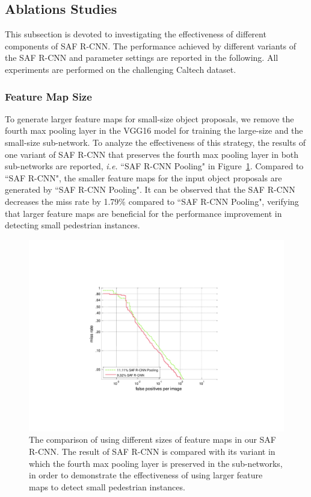 \documentclass[journal]{IEEEtran}
\begin{document}
\subsection{Ablations Studies}
This subsection is devoted to investigating the effectiveness of different components of SAF R-CNN. The performance achieved by different variants of the SAF R-CNN and parameter settings are reported in the following. All experiments are performed on the challenging Caltech dataset.

\subsubsection{Feature Map Size}
To generate larger feature maps for small-size object proposals, we remove the fourth max pooling layer in the VGG16 model for training the large-size and the small-size sub-network. To analyze the effectiveness of this strategy, the results of one variant of SAF R-CNN that preserves the fourth max pooling layer in both sub-networks are reported, \emph{i.e.} ``SAF R-CNN Pooling" in Figure~\ref{fig:Caltech_Pooling}. Compared to ``SAF R-CNN", the smaller feature maps for the input object proposals are generated by ``SAF R-CNN Pooling". It can be observed that the SAF R-CNN decreases the miss rate by 1.79$\%$ compared to ``SAF R-CNN Pooling", verifying that larger feature maps are beneficial for the performance improvement in detecting small pedestrian instances. 

\begin{figure}
	\begin{center}
		\includegraphics[scale=0.58]{figures/Caltech_Pooling.pdf}
		\caption{{The comparison of using different sizes of feature maps in our SAF R-CNN. The result of SAF R-CNN is compared with its variant in which the fourth max pooling layer is preserved in the sub-networks, in order to demonstrate the effectiveness of using larger feature maps to detect small pedestrian instances.}}	
		\label{fig:Caltech_Pooling}
	\end{center}
	\vspace{-4mm}
\end{figure}
\end{document}
